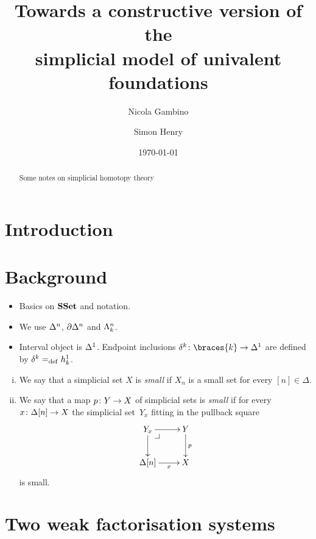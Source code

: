 \documentclass[reqno,10pt,a4paper,oneside,draft]{amsart}
\title[]{Towards a constructive version of the \\ simplicial model of univalent foundations}
\begin{document}
\begin{abstract}
Some notes on simplicial homotopy theory
\end{abstract}

\author{Nicola Gambino}

\author{Simon Henry}


 \date{\today}

\maketitle

\section{Introduction}

\newpage


\section{Background}


\begin{itemize}
\item Basics on $\SSet$ and notation. 
\item We use $\Delt{n}$, $\partial \Delt{n}$ and $\Horn{k}{n}$.
\item Interval object is $\Delt{1}$. Endpoint inclusions $\kcyl \co \braces{ k} \to \Delt{1}$ are
defined by $\kcyl \defeq \horninc{1}{k}$.
\end{itemize}


\begin{definition} \hfill 
\label{thm:small}
\begin{enumerate}[(i)]
\item We say that a simplicial set $X$ is \emph{small}  if $X_n$ is a small set for every $[n] \in \Delta$. 
\item We say that a map $p \co Y \to X$ of simplicial sets is \emph{small} if for every $x \co \Delta[n] 
\to X$ the simplicial set~$Y_x$ fitting in the pullback square
\[
\xymatrix{
Y_x \ar[r] \ar[d] \drpullback & Y \ar[d]^{p} \\
\Delta[n] \ar[r]_-{x} & X }
\]
is small.
\end{enumerate}
\end{definition} 


\section{Two weak factorisation systems} 
\end{document}
